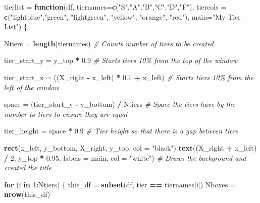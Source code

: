 \documentclass[
]{article}
\newenvironment{Shaded}{\begin{snugshade}}{\end{snugshade}}
\newcommand{\AttributeTok}[1]{\textcolor[rgb]{0.13,0.29,0.53}{#1}}
\newcommand{\CommentTok}[1]{\textcolor[rgb]{0.56,0.35,0.01}{\textit{#1}}}
\newcommand{\ControlFlowTok}[1]{\textcolor[rgb]{0.13,0.29,0.53}{\textbf{#1}}}
\newcommand{\DecValTok}[1]{\textcolor[rgb]{0.00,0.00,0.81}{#1}}
\newcommand{\FloatTok}[1]{\textcolor[rgb]{0.00,0.00,0.81}{#1}}
\newcommand{\FunctionTok}[1]{\textcolor[rgb]{0.13,0.29,0.53}{\textbf{#1}}}
\newcommand{\NormalTok}[1]{#1}
\newcommand{\OtherTok}[1]{\textcolor[rgb]{0.56,0.35,0.01}{#1}}
\newcommand{\SpecialCharTok}[1]{\textcolor[rgb]{0.81,0.36,0.00}{\textbf{#1}}}
\newcommand{\StringTok}[1]{\textcolor[rgb]{0.31,0.60,0.02}{#1}}
\begin{document}
\begin{Shaded}
\begin{Highlighting}[]
\NormalTok{tierlist }\OtherTok{=} \ControlFlowTok{function}\NormalTok{(df, }\AttributeTok{tiernames=}\FunctionTok{c}\NormalTok{(}\StringTok{"S"}\NormalTok{,}\StringTok{"A"}\NormalTok{,}\StringTok{"B"}\NormalTok{,}\StringTok{"C"}\NormalTok{,}\StringTok{"D"}\NormalTok{,}\StringTok{"F"}\NormalTok{), }
                    \AttributeTok{tiercols =} \FunctionTok{c}\NormalTok{(}\StringTok{"lightblue"}\NormalTok{,}\StringTok{"green"}\NormalTok{, }\StringTok{"lightgreen"}\NormalTok{, }\StringTok{"yellow"}\NormalTok{, }\StringTok{"orange"}\NormalTok{, }\StringTok{"red"}\NormalTok{),}
                    \AttributeTok{main=}\StringTok{"My Tier List"}\NormalTok{) \{}

\NormalTok{  Ntiers }\OtherTok{=} \FunctionTok{length}\NormalTok{(tiernames)}
  \CommentTok{\# Counts number of tiers to be created}

\NormalTok{  tier\_start\_y }\OtherTok{=}\NormalTok{ y\_top }\SpecialCharTok{*} \FloatTok{0.9}
  \CommentTok{\# Starts tiers 10\% from the top of the window}
  
\NormalTok{  tier\_start\_x }\OtherTok{=}\NormalTok{ ((X\_right }\SpecialCharTok{{-}}\NormalTok{ x\_left) }\SpecialCharTok{*} \FloatTok{0.1} \SpecialCharTok{+}\NormalTok{ x\_left)}
  \CommentTok{\# Starts tiers 10\% from the left of the window}

\NormalTok{  space }\OtherTok{=}\NormalTok{ (tier\_start\_y }\SpecialCharTok{{-}}\NormalTok{ y\_bottom) }\SpecialCharTok{/}\NormalTok{ Ntiers}
  \CommentTok{\# Space the tiers have by the number to tiers to ensure they are equal}
  
\NormalTok{  tier\_height }\OtherTok{=}\NormalTok{ space }\SpecialCharTok{*} \FloatTok{0.9}
  \CommentTok{\# Tier height so that there is a gap between tiers}
  
  \FunctionTok{rect}\NormalTok{(x\_left, y\_bottom, X\_right, y\_top, }\AttributeTok{col =} \StringTok{"black"}\NormalTok{)}
  \FunctionTok{text}\NormalTok{((X\_right }\SpecialCharTok{+}\NormalTok{ x\_left) }\SpecialCharTok{/} \DecValTok{2}\NormalTok{, y\_top }\SpecialCharTok{*} \FloatTok{0.95}\NormalTok{, }\AttributeTok{labels =}\NormalTok{ main, }\AttributeTok{col =} \StringTok{"white"}\NormalTok{)}
  \CommentTok{\# Draws the background and created the title }
  
  \ControlFlowTok{for}\NormalTok{ (i }\ControlFlowTok{in} \DecValTok{1}\SpecialCharTok{:}\NormalTok{Ntiers) \{}
\NormalTok{    this\_df }\OtherTok{=} \FunctionTok{subset}\NormalTok{(df, tier }\SpecialCharTok{==}\NormalTok{ tiernames[i])}
\NormalTok{    Nboxes }\OtherTok{=} \FunctionTok{nrow}\NormalTok{(this\_df)}


\end{Highlighting}
\end{Shaded}
\end{document}
